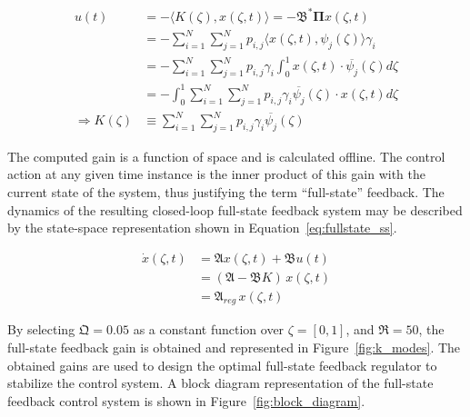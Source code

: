 \begin{equation} \label{eq:fullstate_gain}
    \begin{aligned}
        u(t) &= - \langle {K}(\zeta), {x}(\zeta, t) \rangle = - \mathfrak{B}^* \mathbf{\Pi} {x}(\zeta, t) \\
        &= - \sum_{i=1}^N\sum_{j=1}^N p_{i,j} \langle {x}(\zeta, t), {\psi_j}(\zeta) \rangle \gamma_i \\
        &= - \sum_{i=1}^N\sum_{j=1}^N p_{i,j} \gamma_i \int_0^1 {x}(\zeta, t) \cdot \overline{{\psi_j}}(\zeta) d\zeta \\
        &= - \int_0^1 \sum_{i=1}^N\sum_{j=1}^N p_{i,j} \gamma_i \overline{{\psi_j}}(\zeta) \cdot {x}(\zeta, t) d\zeta \\
        \Rightarrow {K}(\zeta) &\equiv \sum_{i=1}^N\sum_{j=1}^N p_{i,j} \gamma_i \overline{{\psi_j}}(\zeta)
    \end{aligned}
\end{equation}

The computed gain is a function of space and is calculated offline. The control action at any given time instance is the inner product of this gain with the current state of the system, thus justifying the term ``full-state'' feedback. The dynamics of the resulting closed-loop full-state feedback system may be described by the state-space representation shown in Equation~\ref{eq:fullstate_ss}.

\begin{equation}
    \begin{aligned} \label{eq:fullstate_ss}
        \dot{x}(\zeta, t) &= \mathfrak{A} {x}(\zeta, t) + \mathfrak{B} u(t) \\
        &= (\mathfrak{A} - \mathfrak{B} {K}) \, {x}(\zeta, t) \\
        &= \mathfrak{A}_{reg} \, {x}(\zeta, t)
    \end{aligned}
\end{equation}

By selecting $\mathfrak{Q} = 0.05$ as a constant function over $\zeta = [0,1]$, and $\mathfrak{R} = 50$, the full-state feedback gain is obtained and represented in Figure~\ref{fig:k_modes}. The obtained gains are used to design the optimal full-state feedback regulator to stabilize the control system. A block diagram representation of the full-state feedback control system is shown in Figure~\ref{fig:block_diagram}.

